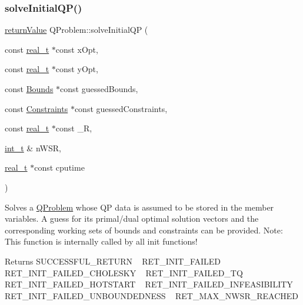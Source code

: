 \subsubsection{\texorpdfstring{solve\+Initial\+Q\+P()}{solveInitialQP()}}
{\footnotesize\ttfamily \hyperlink{_message_handling_8hpp_a81d556f613bfbabd0b1f9488c0fa865e}{return\+Value} Q\+Problem\+::solve\+Initial\+QP (\begin{DoxyParamCaption}\item[{const \hyperlink{qp_o_a_s_e_s__wrapper_8h_a0d00e2b3dfadee81331bbb39068570c4}{real\+\_\+t} $\ast$const}]{x\+Opt,  }\item[{const \hyperlink{qp_o_a_s_e_s__wrapper_8h_a0d00e2b3dfadee81331bbb39068570c4}{real\+\_\+t} $\ast$const}]{y\+Opt,  }\item[{const \hyperlink{class_bounds}{Bounds} $\ast$const}]{guessed\+Bounds,  }\item[{const \hyperlink{class_constraints}{Constraints} $\ast$const}]{guessed\+Constraints,  }\item[{const \hyperlink{qp_o_a_s_e_s__wrapper_8h_a0d00e2b3dfadee81331bbb39068570c4}{real\+\_\+t} $\ast$const}]{\+\_\+R,  }\item[{\hyperlink{_types_8hpp_ab6fd6105e64ed14a0c9281326f05e623}{int\+\_\+t} \&}]{n\+W\+SR,  }\item[{\hyperlink{qp_o_a_s_e_s__wrapper_8h_a0d00e2b3dfadee81331bbb39068570c4}{real\+\_\+t} $\ast$const}]{cputime }\end{DoxyParamCaption})\hspace{0.3cm}{\ttfamily [protected]}}

Solves a \hyperlink{class_q_problem}{Q\+Problem} whose QP data is assumed to be stored in the member variables. A guess for its primal/dual optimal solution vectors and the corresponding working sets of bounds and constraints can be provided. Note\+: This function is internally called by all init functions! \begin{DoxyReturn}{Returns}
S\+U\+C\+C\+E\+S\+S\+F\+U\+L\+\_\+\+R\+E\+T\+U\+RN ~\newline
 R\+E\+T\+\_\+\+I\+N\+I\+T\+\_\+\+F\+A\+I\+L\+ED ~\newline
 R\+E\+T\+\_\+\+I\+N\+I\+T\+\_\+\+F\+A\+I\+L\+E\+D\+\_\+\+C\+H\+O\+L\+E\+S\+KY ~\newline
 R\+E\+T\+\_\+\+I\+N\+I\+T\+\_\+\+F\+A\+I\+L\+E\+D\+\_\+\+TQ ~\newline
 R\+E\+T\+\_\+\+I\+N\+I\+T\+\_\+\+F\+A\+I\+L\+E\+D\+\_\+\+H\+O\+T\+S\+T\+A\+RT ~\newline
 R\+E\+T\+\_\+\+I\+N\+I\+T\+\_\+\+F\+A\+I\+L\+E\+D\+\_\+\+I\+N\+F\+E\+A\+S\+I\+B\+I\+L\+I\+TY ~\newline
 R\+E\+T\+\_\+\+I\+N\+I\+T\+\_\+\+F\+A\+I\+L\+E\+D\+\_\+\+U\+N\+B\+O\+U\+N\+D\+E\+D\+N\+E\+SS ~\newline
 R\+E\+T\+\_\+\+M\+A\+X\+\_\+\+N\+W\+S\+R\+\_\+\+R\+E\+A\+C\+H\+ED 
\end{DoxyReturn}

